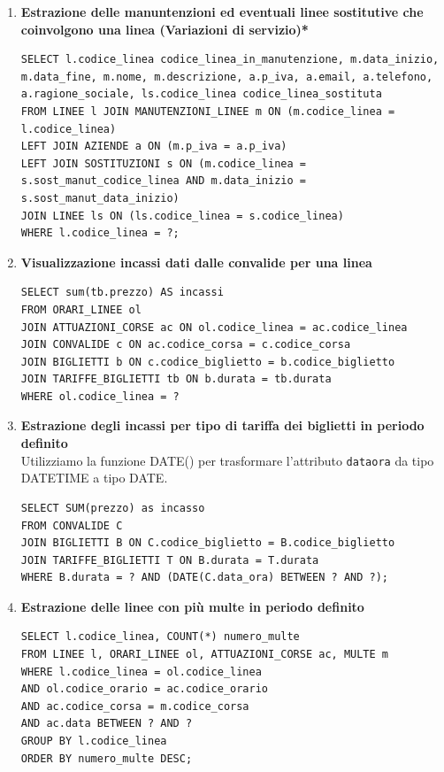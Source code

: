 \documentclass[12pt,a4paper]{report}
\begin{document}
\begin{enumerate}[label=\textbf{\arabic*)}]
\item \textbf{Estrazione delle manuntenzioni ed eventuali linee sostitutive che coinvolgono una linea (Variazioni di servizio)*} \\
\begin{lstlisting}[style=sqlstyle, caption=Query for Linee in Manutenzione and Their Sostituzioni]
SELECT l.codice_linea codice_linea_in_manutenzione, m.data_inizio, m.data_fine, m.nome, m.descrizione, a.p_iva, a.email, a.telefono, a.ragione_sociale, ls.codice_linea codice_linea_sostituta
FROM LINEE l JOIN MANUTENZIONI_LINEE m ON (m.codice_linea = l.codice_linea)
LEFT JOIN AZIENDE a ON (m.p_iva = a.p_iva)
LEFT JOIN SOSTITUZIONI s ON (m.codice_linea = s.sost_manut_codice_linea AND m.data_inizio = s.sost_manut_data_inizio)
JOIN LINEE ls ON (ls.codice_linea = s.codice_linea)
WHERE l.codice_linea = ?;
\end{lstlisting}

\item \textbf{Visualizzazione incassi dati dalle convalide per una linea} \\
\begin{lstlisting}[style=sqlstyle, caption=Query for Total Revenue (Incassi) by Linea]
SELECT sum(tb.prezzo) AS incassi
FROM ORARI_LINEE ol
JOIN ATTUAZIONI_CORSE ac ON ol.codice_linea = ac.codice_linea
JOIN CONVALIDE c ON ac.codice_corsa = c.codice_corsa
JOIN BIGLIETTI b ON c.codice_biglietto = b.codice_biglietto
JOIN TARIFFE_BIGLIETTI tb ON b.durata = tb.durata
WHERE ol.codice_linea = ?
\end{lstlisting}

\item \textbf{Estrazione degli incassi per tipo di tariffa dei biglietti in periodo definito} \\
Utilizziamo la funzione DATE() per trasformare l'attributo \texttt{data{\textunderscore}ora} da tipo DATETIME a tipo DATE. \\
\begin{lstlisting}[style=sqlstyle]
SELECT SUM(prezzo) as incasso
FROM CONVALIDE C
JOIN BIGLIETTI B ON C.codice_biglietto = B.codice_biglietto
JOIN TARIFFE_BIGLIETTI T ON B.durata = T.durata
WHERE B.durata = ? AND (DATE(C.data_ora) BETWEEN ? AND ?);
\end{lstlisting}

\item \textbf{Estrazione delle linee con più multe in periodo definito} \\
\begin{lstlisting}[style=sqlstyle, caption=Query for Number of Fines per Linea Between Two Dates]
SELECT l.codice_linea, COUNT(*) numero_multe
FROM LINEE l, ORARI_LINEE ol, ATTUAZIONI_CORSE ac, MULTE m
WHERE l.codice_linea = ol.codice_linea
AND ol.codice_orario = ac.codice_orario
AND ac.codice_corsa = m.codice_corsa
AND ac.data BETWEEN ? AND ?
GROUP BY l.codice_linea
ORDER BY numero_multe DESC;
\end{lstlisting}


\end{enumerate}
\end{document}
